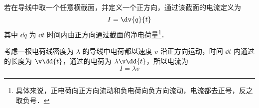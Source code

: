 若在导线中取一个任意横截面，并定义一个正方向，通过该截面的电流定义为
\begin{equation}
I = \dv{q}{t}
\end{equation}
其中 $\dd{q}$ 为 $\dd{t}$ 时间内由正方向通过截面的净电荷量\footnote{具体来说，正电荷向正方向流动和负电荷向负方向流动，电流都去正号，反之取负号．}．

考虑一根电荷线密度为 $\lambda$ 的导线中电荷都以速度 $v$ 沿正方向运动，时间 $\dd{t}$ 内通过的长度为 $\v\dd{t}$，通过的电荷为 $\lambda\v\dd{t}$，所以电流为
\begin{equation}
I = \lambda v
\end{equation}